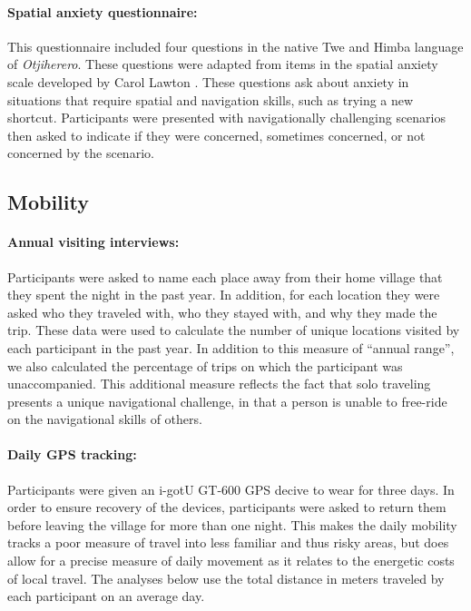 \paragraph{Spatial anxiety questionnaire:}  This questionnaire included four questions in the native Twe and Himba language of \emph{Otjiherero}.  These questions were adapted from items in the spatial anxiety scale developed by Carol Lawton \citep{lawton1994gender}.  These questions ask about anxiety in situations that require spatial and navigation skills, such as trying a new shortcut. Participants were presented with navigationally challenging scenarios then asked to indicate if they were concerned, sometimes concerned, or not concerned by the scenario.

	\subsection{Mobility}
	\label{sec:2.2.4}
	
\paragraph{Annual visiting interviews:}  Participants were asked to name each place away from their home village that they spent the night in the past year.  In addition, for each location they were asked who they traveled with, who they stayed with, and why they made the trip.  These data were used to calculate the number of unique locations visited by each participant in the past year.  In addition to this measure of ``annual range'', we also calculated the percentage of trips on which the participant was unaccompanied.  This additional measure reflects the fact that solo traveling presents a unique navigational challenge, in that a person is unable to free-ride on the navigational skills of others.

\paragraph{Daily GPS tracking:}  Participants were given an i-gotU GT-600 GPS decive to wear for three days.  In order to ensure recovery of the devices, participants were asked to return them before leaving the village for more than one night.  This makes the daily mobility tracks a poor measure of travel into less familiar and thus risky areas, but does allow for a precise measure of daily movement as it relates to the energetic costs of local travel.  The analyses below use the total distance in meters traveled by each participant on an average day. 

